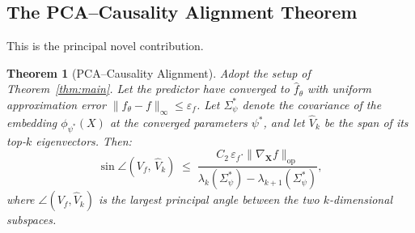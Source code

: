 \documentclass[11pt,a4paper]{article}
\theoremstyle{plain}
\newtheorem{theorem}{Theorem}[section]
\theoremstyle{definition}
\theoremstyle{remark}
\newcommand{\norm}[1]{\| #1 \|}
\begin{document}
\subsection{The PCA--Causality Alignment Theorem}\label{sec:pca-thm}

This is the principal novel contribution.

\begin{theorem}[PCA--Causality Alignment]\label{thm:pca-alignment}
Adopt the setup of Theorem~\ref{thm:main}.  Let the predictor have converged to
$\hat{f}_\theta$ with uniform approximation error
$\norm{\hat{f}_\theta - f}_\infty \leq \varepsilon_f$.  Let $\Sigma_\psi^*$
denote the covariance of the embedding $\phi_{\psi^*}(X)$ at the converged
parameters $\psi^*$, and let $\hat{V}_k$ be the span of its top-$k$
eigenvectors.  Then:
\begin{equation}\label{eq:pca-main}
  \sin\angle(V_f,\,\hat{V}_k)
  \;\leq\;
  \frac{C_2\,\varepsilon_f\cdot\norm{\nabla_{\mathbf{X}} f}_{\mathrm{op}}}
       {\lambda_k(\Sigma_\psi^*) - \lambda_{k+1}(\Sigma_\psi^*)},
\end{equation}
where $\angle(V_f, \hat{V}_k)$ is the largest principal angle between the two
$k$-dimensional subspaces.
\end{theorem}
\end{document}
